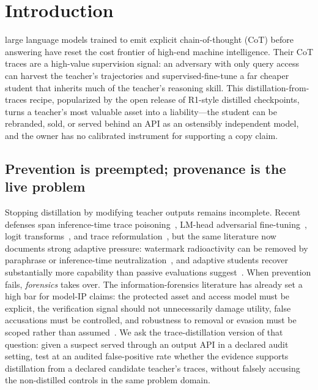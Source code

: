 \section{Introduction}
\label{sec:intro}

 large language models trained to emit explicit
chain-of-thought (CoT) before answering have reset the cost frontier of high-end
machine intelligence. Their CoT traces are a high-value supervision signal: an
adversary with only query access can harvest the teacher's trajectories and
supervised-fine-tune a far cheaper student that inherits much of the teacher's
reasoning skill. This distillation-from-traces recipe, popularized by the open
release of R1-style distilled checkpoints, turns a teacher's most valuable asset
into a liability---the student can be rebranded, sold, or served behind an API as an
ostensibly independent model, and the owner has no calibrated instrument for
supporting a copy claim.

\subsection{Prevention is preempted; provenance is the live problem}
Stopping distillation by modifying teacher outputs remains incomplete. Recent
defenses span inference-time trace poisoning~\cite{savani2025antidistillationsampling},
LM-head adversarial fine-tuning~\cite{li2025doge}, logit transforms~\cite{fang2026cmi},
and trace reformulation~\cite{ding2025part, ma2026tracerewriting}, but the same
literature now documents strong adaptive pressure: watermark radioactivity can be
removed by paraphrase or inference-time neutralization~\cite{pan2025watermarkdistillation},
and adaptive students recover substantially more capability than passive evaluations
suggest~\cite{allouah2026distillationgame}. When prevention fails,
\emph{forensics} takes over. The information-forensics literature has already set a
high bar for model-IP claims: the protected asset and access model must be explicit,
the verification signal should not unnecessarily damage utility, false accusations
must be controlled, and robustness to removal or evasion must be scoped rather than
assumed~\cite{zheng2022dnnfingerprint, zhang2023cip, li2023dvbw,
zhou2024inversionguided, xu2025ipprotection}. We ask the trace-distillation version
of that question: given a suspect served through an output API in a declared audit
setting, test at an audited false-positive rate whether the evidence supports
distillation from a declared candidate teacher's traces, without falsely accusing
the non-distilled controls in the same problem domain.

